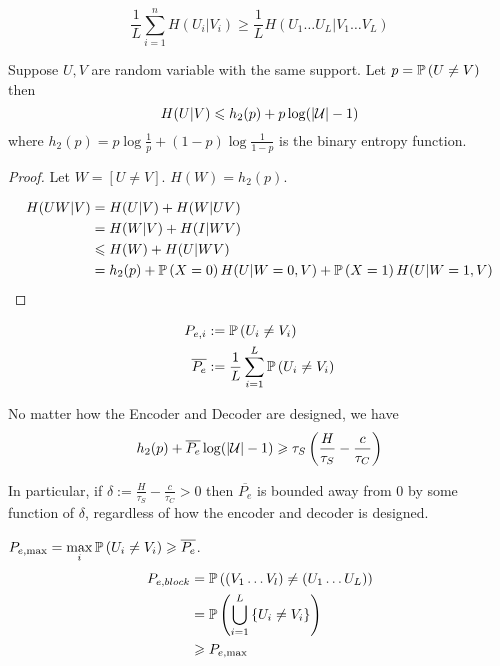 \begin{proposition}
    \[
        \frac{1}{L} \sum\limits_{i=1}^n H(U_i \vert V_i) \geqslant \frac{1}{L} H(U_1\ldots U_L \vert V_1\ldots V_L)
    \]
\end{proposition}

\begin{theorem}
    Suppose $U, V$ are random variable with the same support. Let $p=\mathbb{P}\left( U\neq V \right)$ then
    \[
        H(U\vert V) \leqslant h_2(p) + p\log(\lvert \mathcal{U} \rvert - 1)    
    \]
    where $h_2(p) = p \log \frac{1}{p} + (1-p) \log\frac{1}{1-p}$ is the binary entropy function.
\end{theorem}
\begin{proof}
    Let $W = [U\neq V]$. $H(W) = h_2(p)$.
    
    \[
        \begin{aligned}
            H(UW \vert V) &= H(U\vert V) + H(W\vert UV)\\
            &= H(W\vert V) + H(I\vert WV)\\
            &\leqslant H(W) + H(U\vert WV)\\
            &=h_2(p) + \mathbb{P}\left( X=0 \right)H(U\vert W=0,V) + \mathbb{P}\left( X=1 \right)H(U\vert W=1,V)
        \end{aligned}            
    \]
\end{proof}

\begin{definition}[Errors]
    \[
        \begin{aligned}
            P_{e,i} &:= \mathbb{P}\left( U_i \neq V_i \right)\\
            \overline{P_e} &:= \frac{1}{L} \sum\limits_{i=1}^L \mathbb{P}\left( U_i \neq V_i \right)
        \end{aligned}
    \]
\end{definition}


\begin{theorem}
    No matter how the Encoder and Decoder are designed, we have
    \[
        h_2(p) + \overline{P_e} \log(\lvert\mathcal{U}\rvert - 1)    \geqslant \tau_S\left( \frac{H}{\tau_S} - \frac{c}{\tau_C}\right)
    \]
\end{theorem}
In particular, if $\delta := \frac{H}{\tau_S} - \frac{c}{\tau_C}>0$ then $\overline{P_e}$ is bounded away from 0 by some function of $\delta$, regardless of how the encoder and decoder is designed.

$P_{e,\max} = \max\limits_i \mathbb{P}\left( U_i \neq V_i \right) \geqslant \overline{P_e}$.
\[
    \begin{aligned}
        P_{e,block} &= \mathbb{P}\left( (V_1\ldots V_l)\neq(U_1\ldots U_L) \right)\\
        &=\mathbb{P}\left( \bigcup\limits_{i=1}^L\left\{ U_i\neq V_i \right\} \right)\\
        &\geqslant P_{e,\max}
    \end{aligned}
\]

